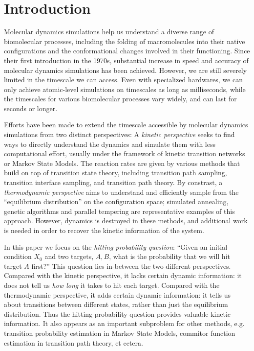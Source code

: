 \documentclass[english, aip, jcp, priprint, graphicx,floatfix]{revtex4-1}
\theoremstyle{plain}
\theoremstyle{definition}
\theoremstyle{plain}
\begin{document}
\section{Introduction}

Molecular dynamics simulations help us understand a diverse range of biomolecular processes, including the folding of macromolecules into their native configurations\cite{Scheraga2007-qw} and the conformational changes involved in their functioning.\cite{Hospital2015-ol} Since their first introduction in the 1970s,\cite{McCammon1977-kg, Warshel1976-qg} substantial increase in speed and accuracy of molecular dynamics simulations has been achieved. However, we are still severely limited in the timescale we can access. Even with specialized hardwares, we can only achieve atomic-level simulations on timescales as long as milliseconds,\cite{Dror2012-ws} while the timescales for various biomolecular processes vary widely, and can last for seconds or longer.\cite{Naganathan2005-ki, Zemora2010-lb} 

Efforts have been made to extend the timescale accessible by molecular dynamics simulations from two distinct perspectives: A \emph{kinetic perspective} seeks to find ways to directly understand the dynamics and simulate them with less computational effort, usually under the framework of kinetic transition networks\cite{Noe2006-cs, Wales2006-ur} or Markov State Models\cite{Pande2010-yi, Chodera2014-bh, Husic2018-xp}. The reaction rates are given by various methods that build on top of transition state theory\cite{Eyring1935-ur, Chandler1978-bq, Wigner1997-kk}, including transition path sampling\cite{Dellago1998-lb, Bolhuis2002-ws}, transition interface sampling\cite{Van_Erp2005-vw}, and transition path theory\cite{E2006-fm, E2010-sr}. By constrast, a \emph{thermodynamic perspective} aims to understand and efficiently sample from the ``equilibrium distribution'' on the configuration space; simulated annealing,\cite{Kirkpatrick1983-su} genetic algorithms\cite{Goldberg1989-ko} and parallel tempering\cite{Sugita1999-vh} are representative examples of this approach. However, dynamics is destroyed in these methods, and additional work\cite{Yang2007-gn, Andrec2005-fh, Zheng2009-ow, Huang2010-uu} is needed in order to recover the kinetic information of the system.

In this paper we focus on the \emph{hitting probability question}: ``Given an initial condition $X_0$ and two targets, $A,B$, what is the probability that we will hit target $A$ first?'' This question lies in-between the two different perspectives. Compared with the kinetic perspective, it lacks certain dynamic information: it does not tell us \emph{how long} it takes to hit each target.  Compared with the thermodynamic perspective, it adds certain dynamic information: it tells us about transitions between different states, rather than just the equilibrium distribution. Thus the hitting probability question provides valuable kinetic information.  It also appears as an important subproblem for other methods, e.g. transition probability estimation in Markov State Models, commitor function estimation in transition path theory, et cetera.
\end{document}
